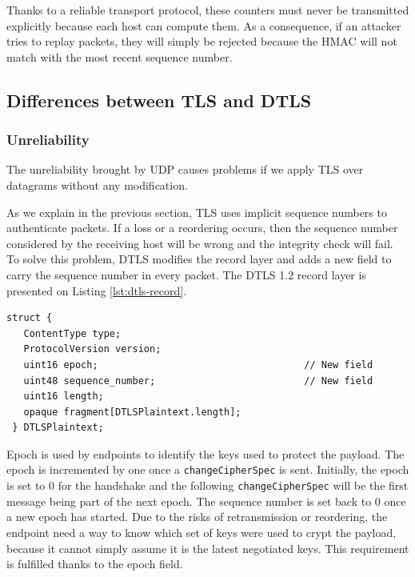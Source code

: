 Thanks to a reliable transport protocol, these counters must never be transmitted explicitly because each host can compute them. As a consequence, if an attacker tries to replay packets, they will simply be rejected because the HMAC will not match with the most recent sequence number.

\subsection{Differences between TLS and DTLS}

\subsubsection{Unreliability}

The unreliability brought by UDP causes problems if we apply TLS over datagrams without any modification.

As we explain in the previous section, TLS uses implicit sequence numbers to authenticate packets. If a loss or a reordering occurs, then the sequence number considered by the receiving host will be wrong and the integrity check will fail. To solve this problem, DTLS modifies the record layer and adds a new field to carry the sequence number in every packet. The DTLS 1.2 record layer is presented on Listing \ref{lst:dtls-record}.

\begin{lstlisting}[caption=DTLS record layer, label=lst:dtls-record]
struct {
   ContentType type;
   ProtocolVersion version;
   uint16 epoch;                                    // New field
   uint48 sequence_number;                          // New field
   uint16 length;
   opaque fragment[DTLSPlaintext.length];
 } DTLSPlaintext;
\end{lstlisting}


Epoch is used by endpoints to identify the keys used to protect the payload. The epoch is incremented by one once a \texttt{changeCipherSpec} is sent. Initially, the epoch is set to 0 for the handshake and the following \texttt{changeCipherSpec} will be the first message being part of the next epoch. The sequence number is set back to 0 once a new epoch has started. Due to the risks of retransmission or reordering, the endpoint need a way to know which set of keys were used to crypt the payload, because it cannot simply assume it is the latest negotiated keys. This requirement is fulfilled thanks to the epoch field.

